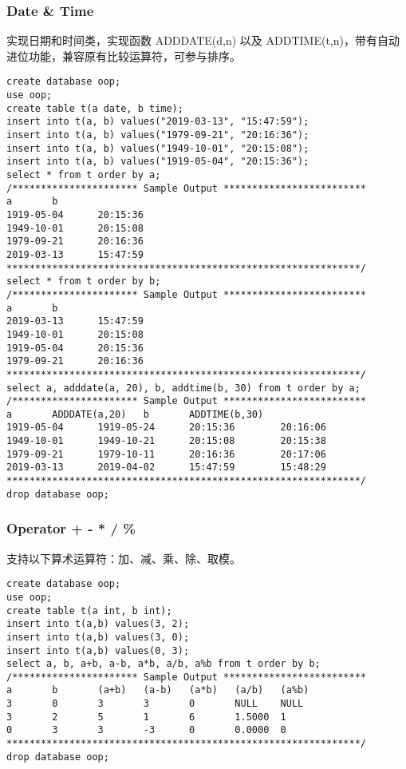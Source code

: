 \documentclass[12pt,a4paper]{article}
\begin{document}
\subsubsection{Date \& Time}

实现日期和时间类，实现函数 ADDDATE(d,n) 以及 ADDTIME(t,n)，带有自动进位功能，兼容原有比较运算符，可参与排序。

\begin{lstlisting}
create database oop;
use oop;
create table t(a date, b time); 
insert into t(a, b) values("2019-03-13", "15:47:59"); 
insert into t(a, b) values("1979-09-21", "20:16:36"); 
insert into t(a, b) values("1949-10-01", "20:15:08"); 
insert into t(a, b) values("1919-05-04", "20:15:36"); 
select * from t order by a; 
/********************** Sample Output *************************
a       b       
1919-05-04      20:15:36        
1949-10-01      20:15:08        
1979-09-21      20:16:36        
2019-03-13      15:47:59    
**************************************************************/
select * from t order by b; 
/********************** Sample Output *************************
a       b       
2019-03-13      15:47:59        
1949-10-01      20:15:08        
1919-05-04      20:15:36        
1979-09-21      20:16:36      
**************************************************************/
select a, adddate(a, 20), b, addtime(b, 30) from t order by a; 
/********************** Sample Output *************************
a       ADDDATE(a,20)   b       ADDTIME(b,30)   
1919-05-04      1919-05-24      20:15:36        20:16:06        
1949-10-01      1949-10-21      20:15:08        20:15:38        
1979-09-21      1979-10-11      20:16:36        20:17:06        
2019-03-13      2019-04-02      15:47:59        15:48:29       
**************************************************************/
drop database oop;
\end{lstlisting}

\subsubsection{Operator + - * / \%}

支持以下算术运算符：加、减、乘、除、取模。

\begin{lstlisting}
create database oop;
use oop;
create table t(a int, b int); 
insert into t(a,b) values(3, 2); 
insert into t(a,b) values(3, 0); 
insert into t(a,b) values(0, 3); 
select a, b, a+b, a-b, a*b, a/b, a%b from t order by b; 
/********************** Sample Output *************************
a       b       (a+b)   (a-b)   (a*b)   (a/b)   (a%b)   
3       0       3       3       0       NULL    NULL    
3       2       5       1       6       1.5000  1       
0       3       3       -3      0       0.0000  0       
**************************************************************/
drop database oop;
\end{lstlisting}
\end{document}

